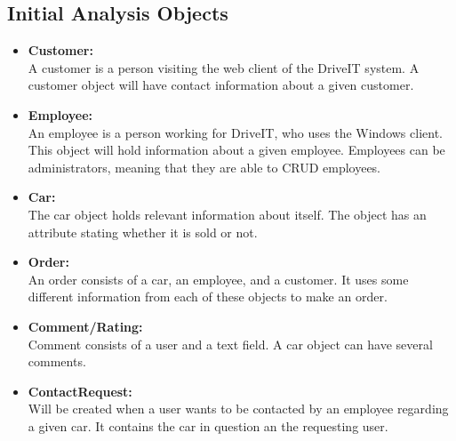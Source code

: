 \subsection{Initial Analysis Objects}
\begin{itemize}
    \item \textbf{Customer:}\\
    A customer is a person visiting the web client of the DriveIT system. A customer object will have contact information about a given customer.
    \item \textbf{Employee:}\\
    An employee is a person working for DriveIT, who uses the Windows client. This object will hold information about a given employee. Employees can be administrators, meaning that they are able to CRUD employees.
    \item \textbf{Car:}\\
    The car object holds relevant information about itself. The object has an attribute stating whether it is sold or not.
    \item \textbf{Order:}\\
    An order consists of a car, an employee, and a customer. It uses some different information from each of these objects to make an order.
    \item \textbf{Comment/Rating:}\\
    Comment consists of a user and a text field. A car object can have several comments.
    \item \textbf{ContactRequest:}\\
    Will be created when a user wants to be contacted by an employee regarding a given car. It contains the car in question an the requesting user.
\end{itemize}
